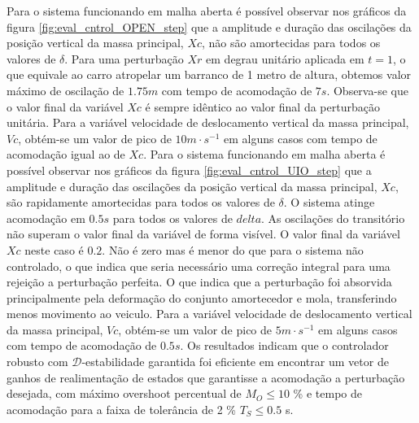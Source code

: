 Para o sistema funcionando em malha aberta é possível observar nos gráficos da figura \ref{fig:eval_cntrol_OPEN_step} que a amplitude e duração das oscilações da posição vertical da massa principal, $Xc$, não são amortecidas para todos os valores de $\delta$. Para uma perturbação $Xr$ em degrau unitário aplicada em $t=1$, o que equivale ao carro atropelar um barranco de 1 metro de altura, obtemos valor máximo de oscilação de $1.75m$ com tempo de acomodação de $7s$. Observa-se que o valor final da variável $Xc$ é sempre idêntico ao valor final da perturbação unitária. Para a variável velocidade de deslocamento vertical da massa principal, $Vc$, obtém-se um valor de pico de $10m\cdot s^{-1}$ em alguns casos com tempo de acomodação igual ao de $Xc$.  
Para o sistema funcionando em malha aberta é possível observar nos gráficos da figura \ref{fig:eval_cntrol_UIO_step} que a amplitude e duração das oscilações da posição vertical da massa principal, $Xc$, são rapidamente amortecidas para todos os valores de $\delta$. O sistema atinge acomodação em $0.5s$ para todos os valores de $delta$. As oscilações do transitório não superam o valor final da variável de forma visível. O valor final da variável $Xc$ neste caso é $0.2$. Não é zero mas é menor do que para o sistema não controlado, o que indica que seria necessário uma correção integral para uma rejeição a perturbação perfeita. O que indica que a perturbação foi absorvida principalmente pela deformação do conjunto amortecedor e mola, transferindo menos movimento ao veiculo.
Para a variável velocidade de deslocamento vertical da massa principal, $Vc$, obtém-se um valor de pico de $5m\cdot s^{-1}$ em alguns casos com tempo de acomodação de $0.5s$.  
Os resultados indicam que o controlador robusto com \( \mathcal{D}\)-estabilidade garantida foi eficiente em encontrar um vetor de ganhos de realimentação de estados que garantisse a acomodação a perturbação desejada, com máximo overshoot percentual de $M_O \leq 10$ \% e tempo de acomodação para a faixa de tolerância de 2 \% $T_S \leq 0.5$ s. 